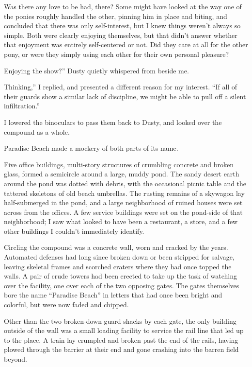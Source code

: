 Was there any love to be had, there? Some might have looked at the way one of the ponies roughly handled the other, pinning him in place and biting, and concluded that there was only self-interest, but I knew things weren’t always so simple. Both were clearly enjoying themselves, but that didn’t answer whether that enjoyment was entirely self-centered or not. Did they care at all for the other pony, or were they simply using each other for their own personal pleasure?

\leavevmode{}Enjoying the show?” Dusty quietly whispered from beside me.

\leavevmode{}Thinking,” I replied, and presented a different reason for my interest. “If all of their guards show a similar lack of discipline, we might be able to pull off a silent infiltration.”

I lowered the binoculars to pass them back to Dusty, and looked over the compound as a whole.

Paradise Beach made a mockery of both parts of its name.

Five office buildings, multi-story structures of crumbling concrete and broken glass, formed a semicircle around a large, muddy pond. The sandy desert earth around the pond was dotted with debris, with the occasional picnic table and the tattered skeletons of old beach umbrellas. The rusting remains of a skywagon lay half-submerged in the pond, and a large neighborhood of ruined houses were set across from the offices. A few service buildings were set on the pond-side of that neighborhood; I saw what looked to have been a restaurant, a store, and a few other buildings I couldn’t immediately identify.

Circling the compound was a concrete wall, worn and cracked by the years. Automated defenses had long since broken down or been stripped for salvage, leaving skeletal frames and scorched craters where they had once topped the walls. A pair of crude towers had been erected to take up the task of watching over the facility, one over each of the two opposing gates. The gates themselves bore the name “Paradise Beach” in letters that had once been bright and colorful, but were now faded and chipped.

Other than the two broken-down guard shacks by each gate, the only building outside of the wall was a small loading facility to service the rail line that led up to the place. A train lay crumpled and broken past the end of the rails, having plowed through the barrier at their end and gone crashing into the barren field beyond.

